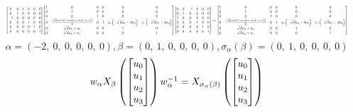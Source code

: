 \documentclass[11pt]{article}
\theoremstyle{definition}
\begin{document}
\[
\scaletoalign{\textwidth}{{\left[\begin{matrix}0 & 0 & 1 & 0 & 0 & 0\\0 & 1 & 0 & 0 & 0 & 0\\-1 & 0 & 0 & 0 & 0 & 0\\0 & 0 & 0 & 1 & 0 & 0\\0 & 0 & 0 & 0 & 1 & 0\\0 & 0 & 0 & 0 & 0 & 1\end{matrix}\right]} {\left[\begin{matrix}1 & 0 & 0 & 0 & 0 & 0\\0 & 1 & 0 & 0 & 0 & 0\\0 & 0 & 1 & 0 & 0 & 0\\0 & \frac{\sqrt{d} \left(c_{0} d u_{2}^{2} - c_{0} u_{0}^{2} + c_{1} d u_{3}^{2} - c_{1} u_{1}^{2}\right)}{2} & 0 & 1 & c_{0} \left(- \sqrt{d} u_{0} + d u_{2}\right) & c_{1} \left(- \sqrt{d} u_{1} + d u_{3}\right)\\0 & \sqrt{d} u_{2} + u_{0} & 0 & 0 & 1 & 0\\0 & \sqrt{d} u_{3} + u_{1} & 0 & 0 & 0 & 1\end{matrix}\right]} {\left[\begin{matrix}0 & 0 & -1 & 0 & 0 & 0\\0 & 1 & 0 & 0 & 0 & 0\\1 & 0 & 0 & 0 & 0 & 0\\0 & 0 & 0 & 1 & 0 & 0\\0 & 0 & 0 & 0 & 1 & 0\\0 & 0 & 0 & 0 & 0 & 1\end{matrix}\right]} = {\left[\begin{matrix}1 & 0 & 0 & 0 & 0 & 0\\0 & 1 & 0 & 0 & 0 & 0\\0 & 0 & 1 & 0 & 0 & 0\\0 & \frac{\sqrt{d} \left(c_{0} d u_{2}^{2} - c_{0} u_{0}^{2} + c_{1} d u_{3}^{2} - c_{1} u_{1}^{2}\right)}{2} & 0 & 1 & c_{0} \left(- \sqrt{d} u_{0} + d u_{2}\right) & c_{1} \left(- \sqrt{d} u_{1} + d u_{3}\right)\\0 & \sqrt{d} u_{2} + u_{0} & 0 & 0 & 1 & 0\\0 & \sqrt{d} u_{3} + u_{1} & 0 & 0 & 0 & 1\end{matrix}\right]}}
\]
\[
\alpha = \left( -2, \  0, \  0, \  0, \  0, \  0\right), \beta = \left( 0, \  1, \  0, \  0, \  0, \  0\right), \sigma_{\alpha}(\beta) = \left( 0, \  1, \  0, \  0, \  0, \  0\right)
\]
\[
\scaletoalign{\textwidth}{w_{\alpha} X_{\beta}\left(\left[\begin{matrix}u_{0}\\u_{1}\\u_{2}\\u_{3}\end{matrix}\right]\right) w_{\alpha}^{-1} = X_{\sigma_{\alpha}\left(\beta\right)}\left(\left[\begin{matrix}u_{0}\\u_{1}\\u_{2}\\u_{3}\end{matrix}\right]\right)}
\]
\end{document}
